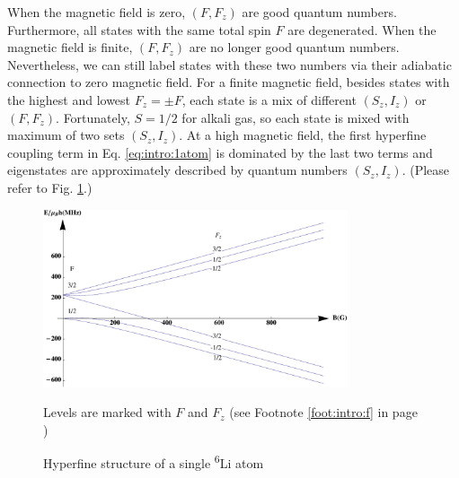 When the magnetic field is zero, $(F,F_{z})$ are good quantum numbers. Furthermore, all states with the same total spin $F$ are degenerated.   When the magnetic field is finite, $(F,F_{z})$ are no longer good quantum numbers. Nevertheless, we can still label states with these two numbers via their adiabatic connection to zero magnetic field.  For a finite magnetic field, besides states with the highest and lowest $F_{z}=\pm{}F$, each state is a mix of different $(S_{z}, I_{z})$ or $(F,F_z)$.  Fortunately, $S=1/2$ for alkali gas,  so each state is mixed with maximum of two sets $(S_{z}, I_{z})$. At a high magnetic field, the first hyperfine coupling term in Eq. \eqref{eq:intro:1atom} is dominated by the last two terms and  eigenstates are approximately described by quantum numbers $(S_{z},I_{z})$.  (Please refer to Fig. \ref{fig:intro:li6}.)

\begin{figure}[htbp]
\begin{center}
\includegraphics[width=0.8\textwidth]{hyperfineLi6}
\caption{Hyperfine structure of a single \textsuperscript{6}Li atom } 
Levels are marked with $F$ and $F_{z}$ {(see Footnote \ref{foot:intro:f} in page \pageref{foot:intro:f})}
\label{fig:intro:li6}
\end{center}
\end{figure}



